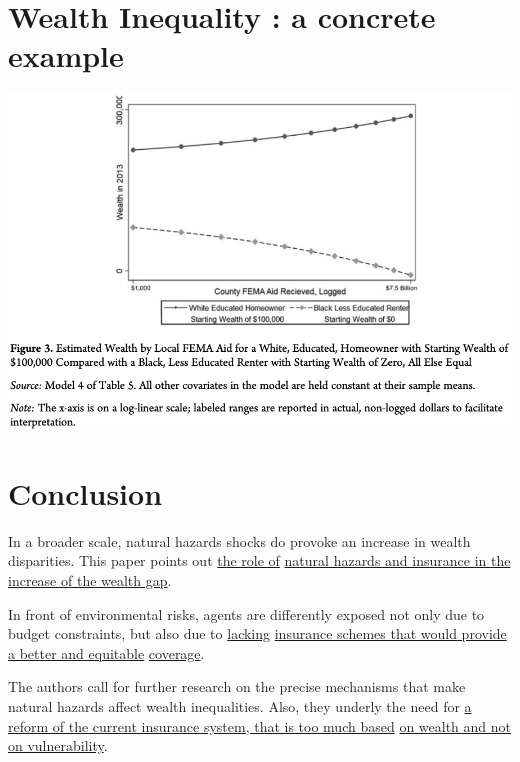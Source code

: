 \documentclass{beamer}
\begin{document}
\section{Wealth Inequality : a concrete example}
    \begin{frame}{\secname}
        \includegraphics[totalheight=7cm,width=1\textwidth]{pictures/Figure_3.png}
    \end{frame}

\section{Conclusion}
    \begin{frame}{\secname}
        In a broader scale, natural hazards shocks do provoke an increase in wealth disparities. 
        This paper points out \underline{the role of}
        \underline{natural hazards and insurance in the increase of the wealth gap}.

        In front of environmental risks, agents are differently exposed not only due to budget constraints,
        but also due to \underline{lacking} \underline{insurance schemes that would provide a better and equitable}
        \underline{coverage}.
        
        The authors call for further research on the precise mechanisms that make natural hazards affect
        wealth inequalities. Also, they underly the need for 
        \underline{a reform of the current insurance system, that 
        is too much based} \underline{on wealth and not on vulnerability}.
    \end{frame}
\end{document}
